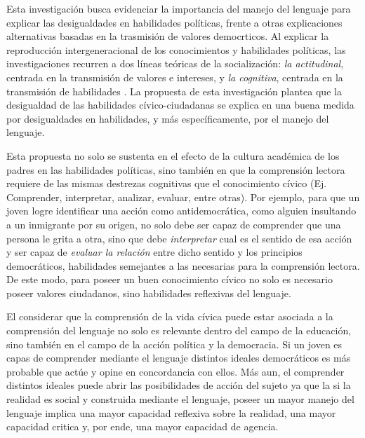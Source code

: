 \documentclass[12pt,twoside]{templates/facsothesis}
\begin{document}
Esta investigación busca evidenciar la importancia del manejo del lenguaje para explicar las desigualdades en habilidades políticas, frente a otras explicaciones alternativas basadas en la trasmisión de valores democrticos. Al explicar la reproducción intergeneracional de los conocimientos y habilidades políticas, las investigaciones recurren a dos líneas teóricas de la socialización: \emph{la actitudinal}, centrada en la transmisión de valores e intereses, y \emph{la cognitiva}, centrada en la transmisión de habilidades \citep{mirandaDesigualdadCiudadaniaAproximacion2018}. La propuesta de esta investigación plantea que la desigualdad de las habilidades cívico-ciudadanas se explica en una buena medida por desigualdades en habilidades, y más específicamente, por el manejo del lenguaje.

Esta propuesta no solo se sustenta en el efecto de la cultura académica de los padres en las habilidades políticas, sino también en que la comprensión lectora requiere de las mismas destrezas cognitivas que el conocimiento cívico (Ej. Comprender, interpretar, analizar, evaluar, entre otras). Por ejemplo, para que un joven logre identificar una acción como antidemocrática, como alguien insultando a un inmigrante por su origen, no solo debe ser capaz de comprender que una persona le grita a otra, sino que debe \emph{interpretar} cual es el sentido de esa acción y ser capaz de \emph{evaluar la relación} entre dicho sentido y los principios democráticos, habilidades semejantes a las necesarias para la comprensión lectora. De este modo, para poseer un buen conocimiento cívico no solo es necesario poseer valores ciudadanos, sino habilidades reflexivas del lenguaje.

El considerar que la comprensión de la vida cívica puede estar asociada a la comprensión del lenguaje no solo es relevante dentro del campo de la educación, sino también en el campo de la acción política y la democracia. Si un joven es capas de comprender mediante el lenguaje distintos ideales democráticos es más probable que actúe y opine en concordancia con ellos. Más aun, el comprender distintos ideales puede abrir las posibilidades de acción del sujeto ya que la si la realidad es social y construida mediante el lenguaje, poseer un mayor manejo del lenguaje implica una mayor capacidad reflexiva sobre la realidad, una mayor capacidad critica y, por ende, una mayor capacidad de agencia.
\end{document}
